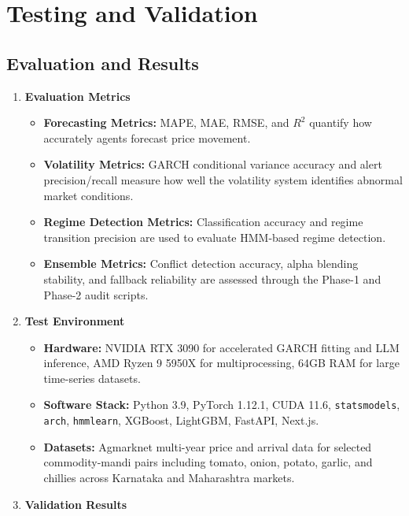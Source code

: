 \documentclass[12pt,a4paper]{report}
\theoremstyle{definition}
\theoremstyle{remark}
\begin{document}
\section{Testing and Validation}

\subsection{Evaluation and Results}

\begin{enumerate}

    \item \textbf{Evaluation Metrics}

\begin{itemize}
\item \textbf{Forecasting Metrics:} MAPE, MAE, RMSE, and $R^2$ quantify how accurately agents forecast price movement.
\item \textbf{Volatility Metrics:} GARCH conditional variance accuracy and alert precision/recall measure how well the volatility system identifies abnormal market conditions.
\item \textbf{Regime Detection Metrics:} Classification accuracy and regime transition precision are used to evaluate HMM-based regime detection.
\item \textbf{Ensemble Metrics:} Conflict detection accuracy, alpha blending stability, and fallback reliability are assessed through the Phase-1 and Phase-2 audit scripts.
\end{itemize}

    \item \textbf{Test Environment}

\begin{itemize}
\item \textbf{Hardware:} NVIDIA RTX 3090 for accelerated GARCH fitting and LLM inference, AMD Ryzen 9 5950X for multiprocessing, 64GB RAM for large time-series datasets.
\item \textbf{Software Stack:} Python 3.9, PyTorch 1.12.1, CUDA 11.6, \texttt{statsmodels}, \texttt{arch}, \texttt{hmmlearn}, XGBoost, LightGBM, FastAPI, Next.js.
\item \textbf{Datasets:} Agmarknet multi-year price and arrival data for selected commodity-mandi pairs including tomato, onion, potato, garlic, and chillies across Karnataka and Maharashtra markets.
\end{itemize}

    \item \textbf{Validation Results}


\end{enumerate}
\end{document}
